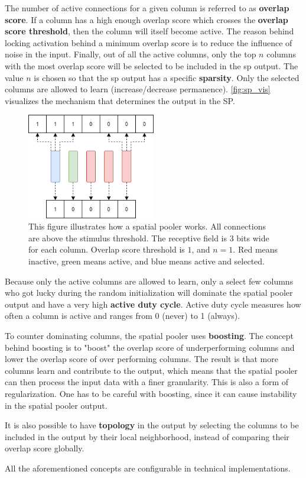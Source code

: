 The number of active connections for a given column is referred to as \textbf{overlap score}. If a column has a high enough overlap score which crosses the \textbf{overlap score threshold}, then the column will itself become active. The reason behind locking activation behind a minimum overlap score is to reduce the influence of noise in the input. Finally, out of all the active columns, only the top $n$ columns with the most overlap score will be selected to be included in the \gls*{sp} output. The value $n$ is chosen so that the \gls*{sp} output has a specific \textbf{sparsity}. Only the selected columns are allowed to learn (increase/decrease permanence). \autoref{fig:sp_vis} visualizes the mechanism that determines the output in the SP.
\par
\begin{figure}[htb]
    \centering
    \includegraphics[width=0.5\textwidth]{resources/related_works/sp_vis.png}
    \caption[Spatial Pooler Workings]{ This figure illustrates how a spatial pooler works. All connections are above the stimulus threshold. The receptive field is 3 bits wide for each column. Overlap score threshold is $1$, and $n=1$. Red means inactive, green means active, and blue means active and selected.}
    \label{fig:sp_vis}
\end{figure}
\par
Because only the active columns are allowed to learn, only a select few columns who got lucky during the random initialization will dominate the spatial pooler output and have a very high \textbf{active duty cycle}. Active duty cycle measures how often a column is active and ranges from 0 (never) to 1 (always).
\par
To counter dominating columns, the spatial pooler uses \textbf{boosting}.
The concept behind boosting is to "boost" the overlap score of underperforming columns and lower the overlap score of over performing columns. The result is that more columns learn and contribute to the output, which means that the spatial pooler can then process the input data with a finer granularity. This is also a form of regularization. One has to be careful with boosting, since it can cause instability in the spatial pooler output.
\par
It is also possible to have \textbf{topology} in the output by selecting the columns to be included in the output by their local neighborhood, instead of comparing their overlap score globally.
\par
All the aforementioned concepts are configurable in technical implementations.

